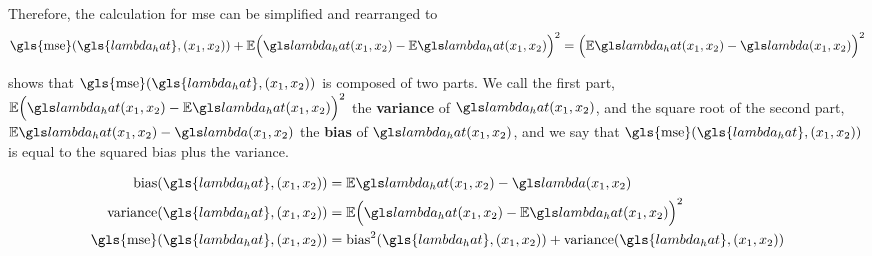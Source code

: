 Therefore, the calculation for \gls{mse} can be simplified and rearranged to 
\begin{equation}
    \label{eq:mse:biasvariance}
    \mbox{\gls{mse}}(\gls{lambda_hat}, \xvec)
        + \E \Big( \lmbdhat - \E\lmbdhat \Big)^2
        = \Big( \E\lmbdhat - \lmbd \Big)^2 
\end{equation}

 shows that $\mbox{\gls{mse}}(\gls{lambda_hat}, \xvec)$
is composed of two parts.
We call the first part, $\E \Big( \lmbdhat - \E\lmbdhat \Big)^2$ the \textbf{variance} of $\lmbdhat$,
and the square root of the second part, $\E\lmbdhat - \lmbd$ the \textbf{bias} of $\lmbdhat$,
and we say that $\mbox{\gls{mse}}(\gls{lambda_hat}, \xvec)$ is equal to the squared bias plus the variance.

\begin{align}
    \mbox{bias}(\gls{lambda_hat}, \xvec) & = \E\lmbdhat - \lmbd \label{eq:estimator:bias} \\
    \mbox{variance}(\gls{lambda_hat}, \xvec) & = \E \Big( \lmbdhat - \E\lmbdhat \Big)^2 \label{eq:estimator:variance} \\
    \mbox{\gls{mse}}(\gls{lambda_hat}, \xvec) & = \mbox{bias}^2 (\gls{lambda_hat}, \xvec) + \mbox{variance} (\gls{lambda_hat}, \xvec) \label{eq:estimator:mse} 
\end{align}

